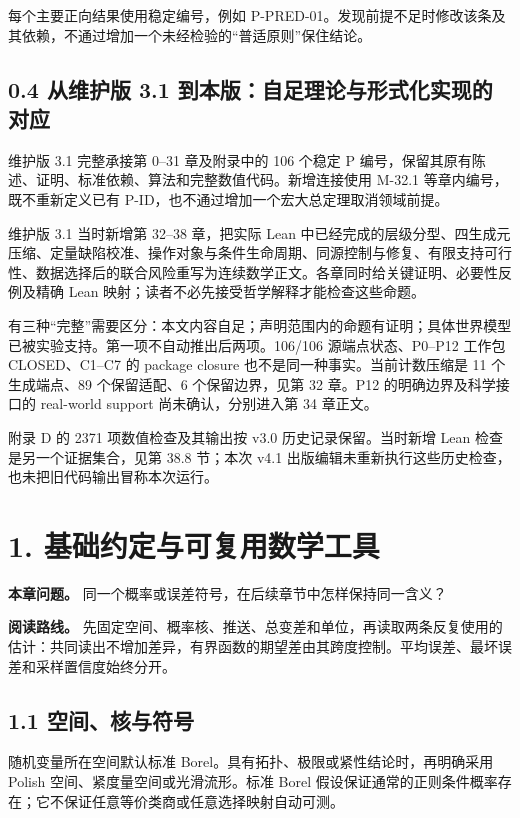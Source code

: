 \documentclass[
  11pt,
  oneside]{book}
\begin{document}
每个主要正向结果使用稳定编号，例如 P-PRED-01。发现前提不足时修改该条及其依赖，不通过增加一个未经检验的``普适原则''保住结论。

\section{0.4 从维护版 3.1 到本版：自足理论与形式化实现的对应}\label{ux4eceux7ef4ux62a4ux7248-3.1-ux5230ux672cux7248ux81eaux8db3ux7406ux8bbaux4e0eux5f62ux5f0fux5316ux5b9eux73b0ux7684ux5bf9ux5e94}

维护版 3.1 完整承接第 0--31 章及附录中的 106 个稳定 P 编号，保留其原有陈述、证明、标准依赖、算法和完整数值代码。新增连接使用 M-32.1 等章内编号，既不重新定义已有 P-ID，也不通过增加一个宏大总定理取消领域前提。

维护版 3.1 当时新增第 32--38 章，把实际 Lean 中已经完成的层级分型、四生成元压缩、定量缺陷校准、操作对象与条件生命周期、同源控制与修复、有限支持可行性、数据选择后的联合风险重写为连续数学正文。各章同时给关键证明、必要性反例及精确 Lean 映射；读者不必先接受哲学解释才能检查这些命题。

有三种``完整''需要区分：本文内容自足；声明范围内的命题有证明；具体世界模型已被实验支持。第一项不自动推出后两项。106/106 源端点状态、P0--P12 工作包 CLOSED、C1--C7 的 package closure 也不是同一种事实。当前计数压缩是 11 个生成端点、89 个保留适配、6 个保留边界，见第 32 章。P12 的明确边界及科学接口的 real-world support 尚未确认，分别进入第 34 章正文。

附录 D 的 2371 项数值检查及其输出按 v3.0 历史记录保留。当时新增 Lean 检查是另一个证据集合，见第 38.8 节；本次 v4.1 出版编辑未重新执行这些历史检查，也未把旧代码输出冒称本次运行。

\chapter{1. 基础约定与可复用数学工具}\label{ch-1}

\textbf{本章问题。} 同一个概率或误差符号，在后续章节中怎样保持同一含义？

\textbf{阅读路线。} 先固定空间、概率核、推送、总变差和单位，再读取两条反复使用的估计：共同读出不增加差异，有界函数的期望差由其跨度控制。平均误差、最坏误差和采样置信度始终分开。

\section{1.1 空间、核与符号}\label{ux7a7aux95f4ux6838ux4e0eux7b26ux53f7}

随机变量所在空间默认标准 Borel。具有拓扑、极限或紧性结论时，再明确采用 Polish 空间、紧度量空间或光滑流形。标准 Borel 假设保证通常的正则条件概率存在；它不保证任意等价类商或任意选择映射自动可测。
\end{document}
